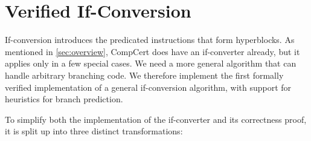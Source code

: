 
\section{Verified If-Conversion}%
\label{sec:if-conversion}

If-conversion introduces the predicated instructions that form hyperblocks.
As mentioned in \cref{sec:overview}, CompCert does have an if-converter already, but it applies only in a few special cases. We need a more general
algorithm that can handle arbitrary branching code.
We therefore implement the first formally verified
implementation of a general if-conversion algorithm, with support for heuristics for branch prediction.

To simplify both the implementation of the if-converter and its correctness proof, it is split up into three distinct
transformations:%

